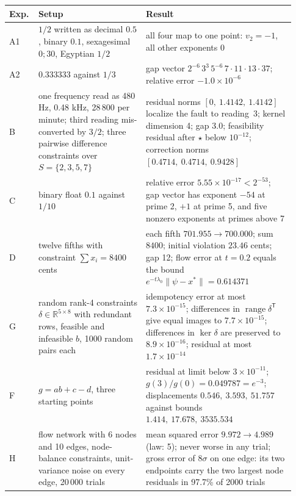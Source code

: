 \documentclass[11pt,letterpaper]{article}
\theoremstyle{plain}
\theoremstyle{definition}
\theoremstyle{remark}
\newcommand{\norm}[1]{\lVert #1\rVert}
\newcommand{\tr}{^{\mathsf T}}
\begin{document}
\begin{center}
\small
\begin{tabular}{@{}>{\raggedright\arraybackslash}p{0.07\linewidth}>{\raggedright\arraybackslash}p{0.36\linewidth}>{\raggedright\arraybackslash}p{0.5\linewidth}@{}}
\toprule
Exp. & Setup & Result\\
\midrule
A1 & $1/2$ written as decimal $0.5$, binary $0.1$, sexagesimal $0;30$, Egyptian $1/2$ & all four map to one point: $v_2=-1$, all other exponents $0$\\
A2 & $0.333333$ against $1/3$ & gap vector $2^{-6}\,3^{3}\,5^{-6}\,7\cdot11\cdot13\cdot37$; relative error $-1.0\times10^{-6}$\\
B & one frequency read as 480 Hz, 0.48 kHz, 28\,800 per minute; third reading mis-converted by $3/2$; three pairwise difference constraints over $S=\{2,3,5,7\}$ & residual norms $[0,\ 1.4142,\ 1.4142]$ localize the fault to reading~3; kernel dimension 4; gap 3.0; feasibility residual after $\star$ below $10^{-12}$; correction norms $[0.4714,\ 0.4714,\ 0.9428]$\\
C & binary float $0.1$ against $1/10$ & relative error $5.55\times10^{-17}<2^{-53}$; gap vector has exponent $-54$ at prime 2, $+1$ at prime 5, and five nonzero exponents at primes above 7\\
D & twelve fifths with constraint $\sum x_i=8400$ cents & each fifth $701.955\to700.000$; sum $8400$; initial violation $23.46$ cents; gap 12; flow error at $t=0.2$ equals the bound $e^{-t\lambda_0}\norm{\psi-x^{*}}=0.614371$\\
G & random rank-4 constraints $\delta\in\mathbb{R}^{5\times8}$ with redundant rows, feasible and infeasible $b$, 1000 random pairs each & idempotency error at most $7.3\times10^{-15}$; differences in $\operatorname{range}\delta\tr$ give equal images to $7.7\times10^{-15}$; differences in $\ker\delta$ are preserved to $8.9\times10^{-16}$; residual at most $1.7\times10^{-14}$\\
F & $g=ab+c-d$, three starting points & residual at limit below $3\times10^{-11}$; $g(3)/g(0)=0.049787=e^{-3}$; displacements $0.546,\ 3.593,\ 51.757$ against bounds $1.414,\ 17.678,\ 3535.534$\\
H & flow network with 6 nodes and 10 edges, node-balance constraints, unit-variance noise on every edge, 20\,000 trials & mean squared error $9.972\to4.989$ (law: 5); never worse in any trial; gross error of $8\sigma$ on one edge: its two endpoints carry the two largest node residuals in 97.7\% of 2000 trials\\

\end{tabular}
\end{center}
\end{document}
